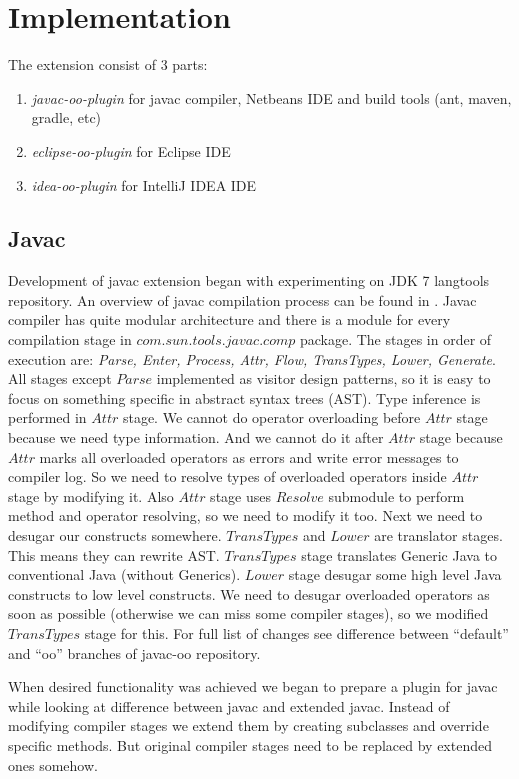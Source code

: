 \documentclass{aircc}
\begin{document}
\section{Implementation}

The extension consist of 3 parts:
\begin{enumerate}
\item \textit{javac-oo-plugin} for javac compiler, Netbeans IDE and build tools (ant, maven, gradle, etc)
\item \textit{eclipse-oo-plugin} for Eclipse IDE
\item \textit{idea-oo-plugin} for IntelliJ IDEA IDE
\end{enumerate}

\subsection{Javac\label{javac}}
Development of javac extension began with experimenting on JDK 7 langtools repository\cite{javac-oo}.
An overview of javac compilation process can be found in \cite{HackerGuideJavac}.
Javac compiler has quite modular architecture and there is a module for every compilation stage in $com.sun.tools.javac.comp$ package.
The stages in order of execution are: \textit{Parse, Enter, Process, Attr, Flow, TransTypes, Lower, Generate}.
All stages except $Parse$ implemented as visitor design patterns, so it is easy to focus on something specific in abstract syntax trees (AST).
Type inference is performed in $Attr$ stage.
We cannot do operator overloading before $Attr$ stage because we need type information. 
And we cannot do it after $Attr$ stage because $Attr$ marks all overloaded operators as errors and write error messages to compiler log.
So we need to resolve types of overloaded operators inside $Attr$ stage by modifying it. 
Also $Attr$ stage uses $Resolve$ submodule to perform method and operator resolving, so we need to modify it too.
Next we need to desugar our constructs somewhere.
$TransTypes$ and $Lower$ are translator stages. This means they can rewrite AST.
$TransTypes$ stage translates Generic Java to conventional Java (without Generics).
$Lower$ stage desugar some high level Java constructs to low level constructs.
We need to desugar overloaded operators as soon as possible (otherwise we can miss some compiler stages), 
so we modified $TransTypes$ stage for this.
For full list of changes see difference between ``default'' and ``oo'' branches of javac-oo repository\cite{javac-oo}.

When desired functionality was achieved we began to prepare a plugin for javac while looking at difference between javac and extended javac.
Instead of modifying compiler stages we extend them by creating subclasses and override specific methods.
But original compiler stages need to be replaced by extended ones somehow.
\end{document}
